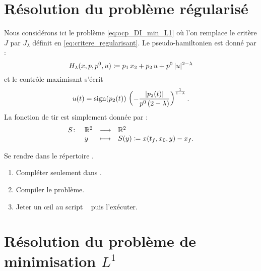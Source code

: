 \section{R\'esolution du probl\`eme r\'egularis\'e}

Nous consid\'erons ici le probl\`eme \eqref{eq:ocp_DI_min_L1} o\`u l'on remplace le crit\`ere $J$ par $J_\lambda$ d\'efinit
en \eqref{eq:critere_regularisant}. Le pseudo-hamiltonien est donn\'e par :
\[
    H_\lambda(x,p,p^0,u) \coloneqq p_1\, x_2 + p_2\, u + p^0\, \lvert u\rvert^{2-\lambda}
\]
et le contr\^ole maximisant s'\'ecrit
\[
    u(t) = \operatorname{sign}(p_2(t))\, \left( - \frac{\lvert p_2(t)\rvert}{p^0\, (2-\lambda)} \right)^{\frac{1}{1-\lambda}}.
\]
La fonction de tir est simplement donn\'ee par :
\begin{equation*}
    \begin{array}{rlll}
        S \colon    & \mathbb{R}^2    & \longrightarrow   & \mathbb{R}^2 \\
                    & y       & \longmapsto       & S(y) \coloneqq x(t_f,x_0,y) - x_f.
    \end{array}
\end{equation*}

\begin{myExercice} Se rendre dans le r\'epertoire .
    \begin{enumerate}
        \item Compl\'eter seulement  dans .
        \item Compiler le probl\`eme.
        \item Jeter un \oe il au script \matlab\  puis l'ex\'ecuter.
    \end{enumerate}
\end{myExercice}

\section{R\'esolution du probl\`eme de minimisation $L^1$}


